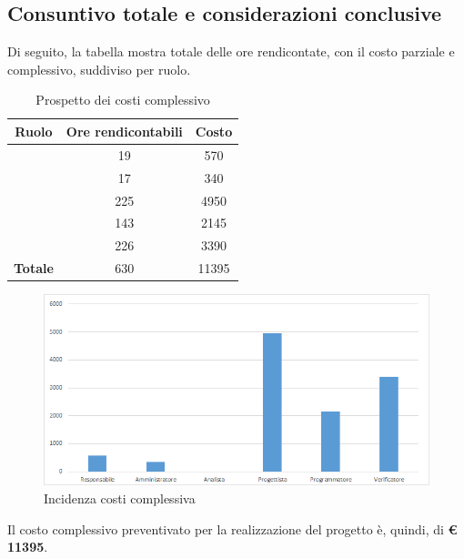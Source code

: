 \subsection{Consuntivo totale e considerazioni conclusive}

Di seguito, la tabella mostra totale delle ore rendicontate, con il costo parziale e complessivo, suddiviso per ruolo. 

\begin{table}[H]
	\begin{center}
		\begin{tabular}{|c|c|c|}
			\hline
			\textbf{Ruolo}	& \textbf{Ore rendicontabili} & \textbf{Costo} \\
			\hline
			\Res	&	19  &	570	\\
			\hline
			\Amm	&	17  &	340	\\
			\hline
			\Prog	&	225  &	4950	\\
			\hline
			\Progr	&	143  &	2145	\\
			\hline
			\Ver	&	226  &	3390	\\
			\hline
			\textbf{Totale}  &	630  &	11395	\\
			\hline
		\end{tabular}
	\end{center}
	\caption{Prospetto dei costi complessivo}
\end{table}

\begin{figure}[H]
	\centering
	\includegraphics[scale=0.6]{img/8-6.png}
	\caption{Incidenza costi complessiva}
\end{figure}

Il costo complessivo preventivato per la realizzazione del progetto è, quindi, di \textbf{€ 11395}.